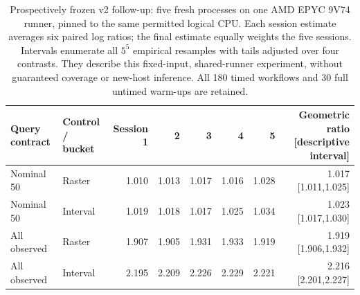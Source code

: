 \begin{table}[t]\centering\small
\begin{tabular}{llrrrrrr}\toprule
Query contract & Control / bucket & Session 1 & 2 & 3 & 4 & 5 & Geometric ratio [descriptive interval]\\\midrule
Nominal 50 & Raster & 1.010 & 1.013 & 1.017 & 1.016 & 1.028 & 1.017 [1.011,1.025]\\
Nominal 50 & Interval & 1.019 & 1.018 & 1.017 & 1.025 & 1.034 & 1.023 [1.017,1.030]\\
All observed & Raster & 1.907 & 1.905 & 1.931 & 1.933 & 1.919 & 1.919 [1.906,1.932]\\
All observed & Interval & 2.195 & 2.209 & 2.226 & 2.229 & 2.221 & 2.216 [2.201,2.227]\\
\bottomrule\end{tabular}
\caption{Prospectively frozen v2 follow-up: five fresh processes on one AMD EPYC 9V74 runner, pinned to the same permitted logical CPU. Each session estimate averages six paired log ratios; the final estimate equally weights the five sessions. Intervals enumerate all $5^5$ empirical resamples with tails adjusted over four contrasts. They describe this fixed-input, shared-runner experiment, without guaranteed coverage or new-host inference. All 180 timed workflows and 30 full untimed warm-ups are retained.}
\label{tab:affinity-blocks}
\end{table}
